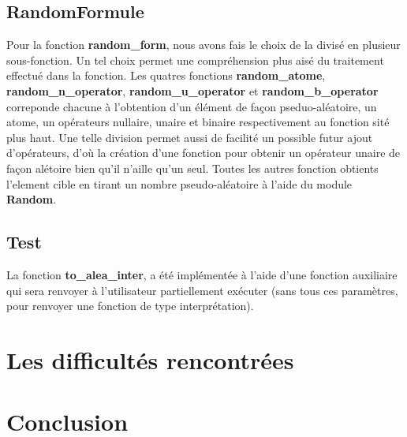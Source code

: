 \documentclass[12pt]{article}
\begin{document}
    \subsection{RandomFormule}

    Pour la fonction \textbf{random\_form}, nous avons fais le choix de la 
    divisé en plusieur sous-fonction. Un tel choix permet une compréhension plus
    aisé du traitement effectué dans la fonction. Les quatres fonctions 
    \textbf{random\_atome}, \textbf{random\_n\_operator}, 
    \textbf{random\_u\_operator} et \textbf{random\_b\_operator} correponde 
    chacune à l'obtention d'un élément de façon pseduo-aléatoire, un atome, un 
    opérateurs nullaire, unaire et binaire respectivement au fonction sité plus 
    haut. Une telle division permet aussi de facilité un possible futur ajout 
    d'opérateurs, d'où la création d'une fonction pour obtenir un opérateur 
    unaire de façon alétoire bien qu'il n'aille qu'un seul. Toutes les autres 
    fonction obtients l'element cible en tirant un nombre pseudo-aléatoire à 
    l'aide du module \textbf{Random}.
    
    \subsection{}

    \subsection{Test}

    La fonction \textbf{to\_alea\_inter}, a été implémentée à l'aide d'une 
    fonction auxiliaire qui sera renvoyer à l'utilisateur partiellement 
    exécuter (sans tous ces paramètres, pour renvoyer une fonction de type 
    interprétation).

    \section{Les difficultés rencontrées}
    
    \section{Conclusion}
\end{document}
